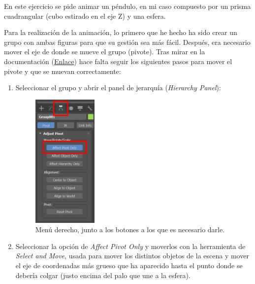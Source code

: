 \documentclass{article}
\begin{document}
En este ejercicio se pide animar un péndulo, en mi caso compuesto por un prisma cuadrangular (cubo estirado en el eje Z) y una esfera.


Para la realización de la animación, lo primero que he hecho ha sido crear un grupo con ambas figuras para que su gestión sea más fácil. Después, era necesario mover el eje de donde se mueve el grupo (pivote). Tras mirar en la documentación (\href{https://knowledge.autodesk.com/support/3ds-max/learn-explore/caas/CloudHelp/cloudhelp/2021/ENU/3DSMax-Animation/files/GUID-6872F014-4785-43D9-A83B-C774507907B3-htm.html}{Enlace}) hace falta seguir los siguientes pasos para mover el pivote y que se muevan correctamente:

\begin{enumerate}
    \item Seleccionar el grupo y abrir el panel de jerarquía (\textit{Hierarchy Panel}):
    
	\begin{figure}[H]
	    \centering
	    \includegraphics[width=0.3\textwidth]{imagenes/Ejercicio 3/pivote_menu.png}
	    \caption{Menú derecho, junto a los botones a los que es necesario darle.}
	\end{figure}


    \item Seleccionar la opción de \textit{Affect Pivot Only} y moverlos con la herramienta de \textit{Select and Move}, usada para mover los distintos objetos de la escena y mover el eje de coordenadas más grueso que ha aparecido hasta el punto donde se debería colgar (justo encima del palo que une a la esfera).
    

\end{enumerate}
\end{document}
